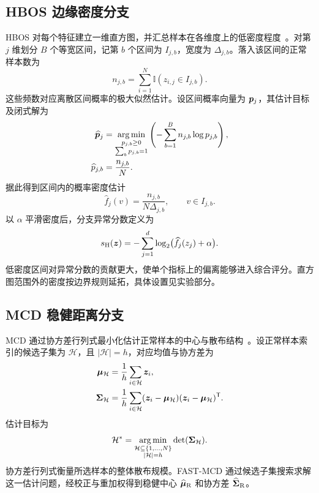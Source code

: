 \subsection{HBOS 边缘密度分支}
HBOS 对每个特征建立一维直方图，并汇总样本在各维度上的低密度程度~\cite{goldstein2012histogram}。对第 $j$ 维划分 $B$ 个等宽区间，记第 $b$ 个区间为 $I_{j,b}$，宽度为 $\Delta_{j,b}$。落入该区间的正常样本数为
\begin{equation}
  n_{j,b}=\sum_{i=1}^{N}\mathbb I(z_{i,j}\in I_{j,b}).
  \label{eq:task4-bin-count}
\end{equation}
这些频数对应离散区间概率的极大似然估计。设区间概率向量为 $\bm{p}_j$，其估计目标及闭式解为
\begin{equation}
\begin{aligned}
  \widehat{\bm{p}}_j
  &=\underset{\substack{p_{j,b}\geq0\\\sum_b p_{j,b}=1}}{\arg\min}
      \left(-\sum_{b=1}^{B}n_{j,b}\log p_{j,b}\right),\\
  \widehat p_{j,b}&=\frac{n_{j,b}}{N}.
\end{aligned}
\label{eq:task4-hist-objective}
\end{equation}
据此得到区间内的概率密度估计
\begin{equation}
  \widehat f_j(v)=\frac{n_{j,b}}{N\Delta_{j,b}},
  \qquad v\in I_{j,b}.
  \label{eq:task4-hist-density}
\end{equation}
以 $\alpha$ 平滑密度后，分支异常分数定义为
\begin{equation}
  s_{\mathrm H}(\bm{z})
  =-\sum_{j=1}^{d}\log_2\bigl(\widehat f_j(z_j)+\alpha\bigr).
  \label{eq:task4-hbos}
\end{equation}
低密度区间对异常分数的贡献更大，使单个指标上的偏离能够进入综合评分。直方图范围外的密度按边界规则延拓，具体设置见实验部分。

\subsection{MCD 稳健距离分支}
MCD 通过协方差行列式最小化估计正常样本的中心与散布结构~\cite{rousseeuw1999fast}。设正常样本索引的候选子集为 $\mathcal H$，且 $|\mathcal H|=h$，对应均值与协方差为
\begin{equation}
\begin{aligned}
  \bm{\mu}_{\mathcal H}
    &=\frac{1}{h}\sum_{i\in\mathcal H}\bm{z}_i,\\
  \bm{\Sigma}_{\mathcal H}
    &=\frac{1}{h}\sum_{i\in\mathcal H}
      (\bm{z}_i-\bm{\mu}_{\mathcal H})
      (\bm{z}_i-\bm{\mu}_{\mathcal H})^{\mathsf T}.
\end{aligned}
\label{eq:task4-mcd-statistics}
\end{equation}
估计目标为
\begin{equation}
  \mathcal H^*
  =\underset{\substack{\mathcal H\subseteq\{1,\ldots,N\}\\|\mathcal H|=h}}{\arg\min}
    \det(\bm{\Sigma}_{\mathcal H}).
  \label{eq:task4-mcd-objective}
\end{equation}
协方差行列式衡量所选样本的整体散布规模。FAST-MCD 通过候选子集搜索求解这一估计问题，经校正与重加权得到稳健中心 $\widehat{\bm{\mu}}_{\mathrm R}$ 和协方差 $\widehat{\bm{\Sigma}}_{\mathrm R}$。

